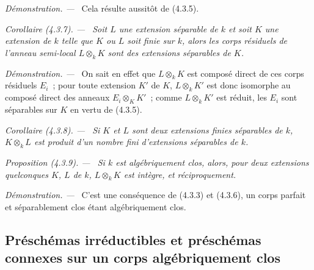 \documentclass[10pt,oneside]{book}
\newcommand{\oldpage}[2][]{%
  \setcounter{footnote}{0}%
  \marginpar{\scriptsize\textbf{#1}~|~#2}\ignorespaces}
\newenvironment{proposition}[1][]{%
  \par\medskip\noindent\itshape Proposition (#1). ---\ }{\par}
\newenvironment{corollary}[1][]{%
  \par\medskip\noindent\itshape Corollaire (#1). ---\ }{\par}
\newenvironment{proof}{%
  \par\medskip\noindent\textit{Démonstration. ---\ }}{\par}
\begin{document}
\begin{proof}
Cela résulte aussitôt de (4.3.5).
\end{proof}

\begin{corollary}[4.3.7]
\label{IV.2.4.3.7-fr}
Soit $L$ une extension séparable de $k$ et soit $K$ une extension de $k$ telle
que $K$ ou $L$ soit finie sur $k$, alors les corps résiduels de l'anneau
semi-local $L\otimes_k K$ sont des extensions séparables de $K$.
\end{corollary}

\begin{proof}
On sait en effet que $L\otimes_k K$ est composé direct de ces corps résiduels
$E_i$~; pour toute extension $K'$ de $K$, $L\otimes_k K'$ est donc isomorphe
au composé direct des anneaux $E_i\otimes_K K'$~; comme $L\otimes_k K'$ est
réduit, les $E_i$ sont séparables sur $K$ en vertu de (4.3.5).
\end{proof}

\begin{corollary}[4.3.8]
\label{IV.2.4.3.8-fr}
Si $K$ et $L$ sont deux extensions finies séparables de $k$, $K\otimes_k L$
est produit d'un nombre fini d'extensions séparables de $k$.
\end{corollary}

\oldpage[IV-2]{59}

\begin{proposition}[4.3.9]
\label{IV.2.4.3.9-fr}
Si $k$ est algébriquement clos, alors, pour deux extensions quelconques $K$,
$L$ de $k$, $L\otimes_k K$ est intègre, et réciproquement.
\end{proposition}

\begin{proof}
C'est une conséquence de (4.3.3) et (4.3.6), un corps parfait et séparablement
clos étant algébriquement clos.
\end{proof}

\subsection{Préschémas irréductibles et préschémas connexes sur un corps
algébriquement clos}
\label{subsection:IV.2.4.4-fr}
\end{document}
